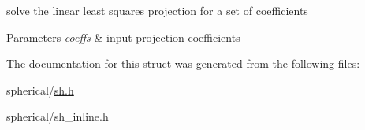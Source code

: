 \label{structnih_1_1_s_h__basis_ac3977f6d1133e5cbbfc72b5478b9daae}
solve the linear least squares projection for a set of coefficients


\begin{DoxyParams}{\-Parameters}
{\em coeffs} & input projection coefficients \\
\hline
\end{DoxyParams}


\-The documentation for this struct was generated from the following files\-:\begin{DoxyCompactItemize}
\item 
spherical/\hyperlink{sh_8h}{sh.\-h}\item 
spherical/sh\-\_\-inline.\-h\end{DoxyCompactItemize}
